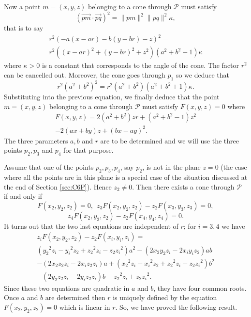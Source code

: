 \documentclass[5p]{elsarticle}
\newcommand\Pc{\mathcal P}
\newcommand{\com}[1]{{\color{black} #1}}
\begin{document}
\com{Now} a point $m=(x,y,z)$ belonging to a cone through $\Pc$ must satisfy
$$ 
(\vec{pm}\cdot\vec{pq})^2=\| pm\|^2 \| pq\|^2  \kappa,
$$
that is to say
\begin{multline*}
r^2\left(-a(x-ar) -b(y-br) -z\right)^2 = \\ r^2\left( (x-ar)^2+ (y-br)^2 +z^2 \right) 
\left( a^2 + b^2 + 1 \right)\kappa
\end{multline*}
where $\kappa>0$ is a constant that corresponds to the angle of the cone.  The factor $r^2$ can be cancelled out. Moreover, the cone goes through $p_1$ so we deduce that
$$ r^2\left(a^2+b^2 \right)^2 = r^2\left( a^2+ b^2  \right)
 \left( a^2 + b^2 + 1 \right)\kappa.
$$
\com{Substituting into} the previous equation, we finally deduce that the point $m=(x,y,z)$ belonging to a cone through $\Pc$ must satisfy $F(x,y,z)=0$ where
\begin{multline*}
	F(x,y,z)  =2\left( {a}^{2}+{b}^{2} \right) zr+ \left( {a}^{2}+{b}^{2}-1
 \right) {z}^{2} \\ -2\left( ax+by \right) z+ \left( bx-ay \right) ^{2
}.
\end{multline*}
The three parameters $a,b$ and $r$ are to be determined and we will use the three points $p_2,p_3$ and $p_4$ for that purpose. 

Assume that \com{one of the points} $p_2,p_3,p_4$, say $p_2$, is not in \com{the plane $z=0$} (the case where all the points are in this plane \com{is a special case of the situation} discussed \com{at the end of Section \ref{sec:C6P}}). Hence $z_2\neq 0$. \com{Then} there exists a cone through $\Pc$ if and only if 
$$ F(x_2,y_2,z_2) = 0, \ \ z_3F(x_2,y_2,z_2)-z_2F(x_3,y_3,z_3)=0,$$ $$z_4F(x_2,y_2,z_2)-z_2F(x_4,y_4,z_4)=0.$$  
It turns out that the two last equations are independent of $r$; for $i=3,4$ we have 
\begin{multline*}
z_iF(x_2,y_2,z_2)-z_2F(x_i,y_i,z_i) = \\
\left( {{ y_2}}^{2}{ z_i}-{{ y_i}}^{2}{ z_2}+{{ z_2}}^{2}{
 z_i}-{ z_2}{{ z_i}}^{2} \right) {a}^{2} 
 - \left( 2{ x_2}
{ y_2}{ z_i}-2{ x_i}{ y_i}{ z_2} \right) ab
\\ - \left( 2{ x_2}{ z_2}{ z_i}-2{ x_i}{ z_2}{ 
z_i} \right) a +
\left( {{ x_2}}^{2}{ z_i}-{{ x_i}}^{2}{ z_2}+{{
 z_2}}^{2}{ z_i}-{ z_2}{{ z_i}}^{2} \right) {b}^{2} \\
 - \left( 
2{ y_2}{ z_2}{ z_i}-2{ y_i}{ z_2}{ z_i}
 \right) b-{{ z_2}}^{2}{ z_i}+{ z_2}{{ z_i}}^{2}.	
\end{multline*}
Since these two equations are quadratic in $a$ and $b$, they have four common roots. Once $a$ and $b$ are determined then $r$ is uniquely defined by the equation  $F(x_2,y_2,z_2) = 0$ which is linear in $r$. So, we have proved the following result. 
\end{document}
